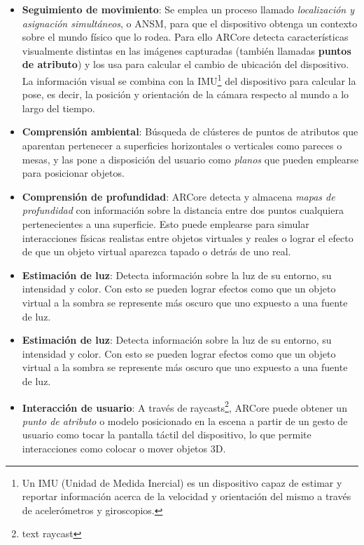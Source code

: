 \begin{itemize}
    \item \textbf{Seguimiento de movimiento}: Se emplea un proceso llamado \textit{localización y asignación simultáneos}, o ANSM, para que el dispositivo obtenga un contexto sobre el mundo físico que lo rodea. Para ello ARCore detecta características visualmente distintas en las imágenes capturadas (también llamadas \textbf{puntos de atributo}) y los usa para calcular el cambio de ubicación del dispositivo. La información visual se combina con la IMU\footnote{Un IMU (Unidad de Medida Inercial) es un dispositivo capaz de estimar y reportar información acerca de la velocidad y orientación del mismo a través de acelerómetros y giroscopios.} del dispositivo para calcular la pose, es decir, la posición y orientación de la cámara respecto al mundo a lo largo del tiempo.

    \item \textbf{Comprensión ambiental}: Búsqueda de clústeres de puntos de atributos que aparentan pertenecer a superficies horizontales o verticales como pareces o mesas, y las pone a disposición del usuario como \textit{planos} que pueden emplearse para posicionar objetos.

    \item \textbf{Comprensión de profundidad}: ARCore detecta y almacena \textit{mapas de profundidad} con información sobre la distancia entre dos puntos cualquiera pertenecientes a una superficie. Esto puede emplearse para simular interacciones físicas realistas entre objetos virtuales y reales o lograr el efecto de que un objeto virtual aparezca tapado o detrás de uno real.

    \item \textbf{Estimación de luz}: Detecta información sobre la luz de su entorno, su intensidad y color. Con esto se pueden lograr efectos como que un objeto virtual a la sombra se represente más oscuro que uno expuesto a una fuente de luz.

    \item \textbf{Estimación de luz}: Detecta información sobre la luz de su entorno, su intensidad y color. Con esto se pueden lograr efectos como que un objeto virtual a la sombra se represente más oscuro que uno expuesto a una fuente de luz.

    \item \textbf{Interacción de usuario}: A través de raycasts\footnote{text raycast}, ARCore puede obtener un \textit{punto de atributo} o modelo posicionado en la escena a partir de un gesto de usuario como tocar la pantalla táctil del dispositivo, lo que permite interacciones como colocar o mover objetos 3D.


\end{itemize}
